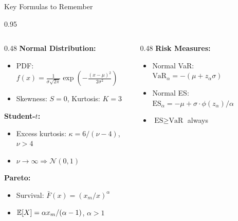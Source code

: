 \documentclass[9pt, aspectratio=169, t]{beamer}
\begin{document}
\begin{frame}{Key Formulas to Remember}
\begin{cminipage}{0.95\textwidth}
    \begin{columns}[T]
        \begin{column}{0.48\textwidth}
            \textbf{Normal Distribution:}
            \begin{itemize}\setlength{\itemsep}{0pt}
                \item PDF: $f(x) = \frac{1}{\sigma\sqrt{2\pi}}\exp\!\left(-\frac{(x-\mu)^2}{2\sigma^2}\right)$
                \item Skewness: $S = 0$, Kurtosis: $K = 3$
            \end{itemize}

            \vspace{0.3cm}

            \textbf{Student-$t$:}
            \begin{itemize}\setlength{\itemsep}{0pt}
                \item Excess kurtosis: $\kappa = 6/(\nu - 4)$, $\nu > 4$
                \item $\nu \to \infty \Rightarrow \mathcal{N}(0,1)$
            \end{itemize}

            \vspace{0.3cm}

            \textbf{Pareto:}
            \begin{itemize}\setlength{\itemsep}{0pt}
                \item Survival: $\bar{F}(x) = (x_m/x)^\alpha$
                \item $\mathbb{E}[X] = \alpha x_m/(\alpha - 1)$, $\alpha > 1$
            \end{itemize}
        \end{column}
        \begin{column}{0.48\textwidth}
            \textbf{Risk Measures:}
            \begin{itemize}\setlength{\itemsep}{0pt}
                \item Normal VaR: $\text{VaR}_\alpha = -(\mu + z_\alpha \sigma)$
                \item Normal ES: $\text{ES}_\alpha = -\mu + \sigma \cdot \phi(z_\alpha)/\alpha$
                \item $\text{ES} \geq \text{VaR}$ always
            \end{itemize}

            \vspace{0.3cm}


\end{column}
\end{columns}
\end{cminipage}
\end{frame}
\end{document}
